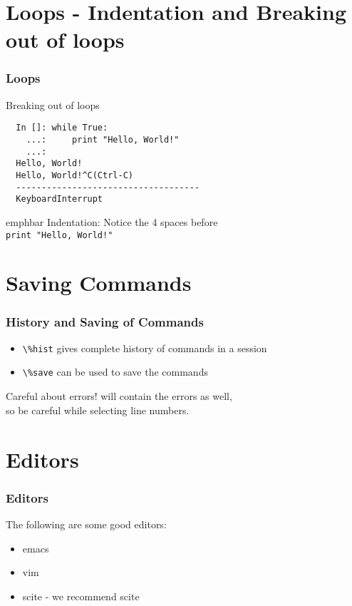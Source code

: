 \documentclass[14pt,compress]{beamer}
\newcommand{\emphbar}[1]
{\begin{beamercolorbox}[rounded=true]{emphbar} 
      {#1}
 \end{beamercolorbox}
}
\newcommand{\typ}[1]{\lstinline{#1}}
\newcommand{\kwrd}[1]{ \texttt{\textbf{\color{blue}{#1}}}  }
\begin{document}
\section{Loops - Indentation and Breaking out of loops}
\begin{frame}[fragile]
\frametitle{Loops}
Breaking out of loops
\begin{lstlisting}     
  In []: while True:
    ...:     print "Hello, World!"
    ...:     
  Hello, World!
  Hello, World!^C(Ctrl-C)
  ------------------------------------
  KeyboardInterrupt                   

\end{lstlisting}
\emphbar{\alert{Indentation: Notice the 4 spaces before\\} \typ{print "Hello, World!"}}
\end{frame}

\section{Saving Commands}
\begin{frame}[fragile]
\frametitle{History and Saving of Commands}
\begin{itemize}
\item \typ{\%hist} gives complete history of commands in a session
\item \typ{\%save} can be used to save the commands
\end{itemize}
\begin{block}{Careful about errors!}
  \kwrd{\%hist} will contain the errors as well,\\
  so be careful while selecting line numbers.
\end{block}
\end{frame}

\section{Editors}
\begin{frame}[fragile]
  \frametitle{Editors}
  The following are some good editors:
  \begin{itemize}
  \item emacs
  \item vim
  \item scite - we recommend scite
  \end{itemize}
\end{frame}
\end{document}
